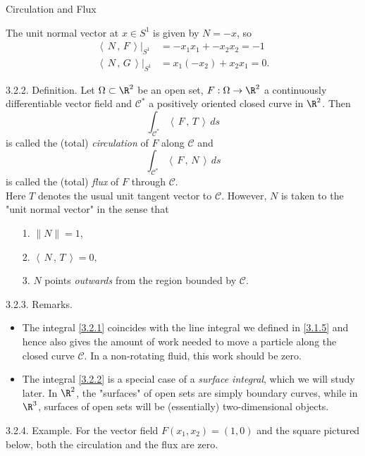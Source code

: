 \documentclass[smaller,hyperref={CJKbookmarks=true}]{beamer}
\newcommand{\scp}[2]{\left\langle\,#1\,,\,#2\,\right\rangle} \newcommand{\scpp}{\langle\,\cdot\,,\,\cdot\,\rangle}
\begin{document}
\begin{frame}{Circulation and Flux}
\begin{spacing}{1.05}
\begin{figure}
\end{figure}
The unit normal vector at $x\in S^1$ is given by $N=-x$, so
\begin{align*}
  \scp{N}{F}\big|_{S^1} &=-x_1x_1+-x_2x_2=-1 \\
  \scp{N}{G}\big|_{S^1} &=x_1(-x_2)+x_2x_1=0.
\end{align*}
\end{spacing}
\newpage
\begin{spacing}{0.9}
\alert{3.2.2. Definition.} Let $\Omega\subset\R^2$ be an open set, $F:\Omega\to\R^2$ a continuously dif{}ferentiable vector field and $\mathcal{C}^*$ a positively oriented closed curve in $\R^2$. Then
\setcounter{equation}{0}
\begin{equation}\label{3.2.1}
\int_{\mathcal{C}^*}\scp{F}{T}\,ds
\end{equation}
is called the (total) \emph{circulation} of $F$ along $\mathcal{C}$ and
\begin{equation}\label{3.2.2}
\int_{\mathcal{C}^*}\scp{F}{N}\,ds
\end{equation}
is called the (total) \emph{flux} of $F$ through $\mathcal{C}$.\\[5pt]
Here $T$ denotes the usual unit tangent vector to $\mathcal{C}$. However, $N$ is taken
to the "unit normal vector" in the sense that
\begin{itemize}
  \item[1.] $\|N\|=1$,
  \item[2.] $\scp{N}{T}=0,$
  \item[3.] $N$ points \emph{outwards} from the region bounded by $\mathcal{C}$.
\end{itemize}
\end{spacing}
\newpage
\begin{spacing}{1.2}
\alert{3.2.3. Remarks.}
\begin{itemize}
  \item The integral \eqref{3.2.1} coincides with the line integral we defined in \eqref{3.1.5} and hence also gives the amount of work needed to move a
particle along the closed curve $\mathcal{C}$. In a non-rotating fluid, this work should be zero.
  \item The integral \eqref{3.2.2} is a special case of a \emph{surface integral}, which we will study later. In $\R^2$, the "surfaces" of open sets are simply boundary curves, while in $\R^3$, surfaces of open sets will be (essentially) two-dimensional objects.
\end{itemize}
\newpage
\alert{3.2.4. Example.} For the vector field $F(x_1,x_2)=(1,0)$ and the square pictured below, both the circulation and the flux are zero.

\end{spacing}
\end{frame}
\end{document}

